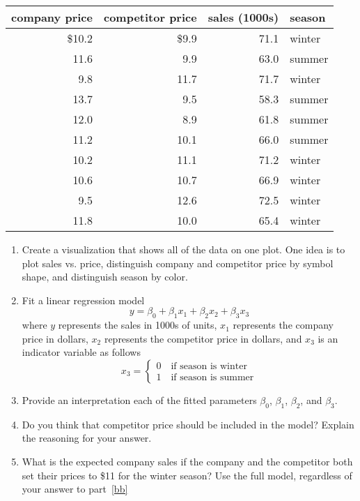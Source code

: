 \begin{enumerate}
\begin{center}
\begin{tabular}{rrrl}
company price & competitor price & sales (1000s) & season \\ \hline
         \$10.2         &     \$9.9  &71.1 &winter \\
         11.6         &     9.9  &63.0 &summer \\
          9.8         &    11.7  &71.7 &winter \\
         13.7         &     9.5  &58.3 &summer \\
         12.0         &     8.9  &61.8 &summer \\
         11.2         &    10.1  &66.0 &summer \\
         10.2         &    11.1  &71.2 &winter \\
         10.6         &    10.7  &66.9 &winter \\
          9.5         &    12.6  &72.5 &winter \\
         11.8         &    10.0  &65.4 &winter
\end{tabular}
\end{center}

\begin{enumerate}
\item Create a visualization that shows all of the data on one plot.
  One idea is to plot sales vs. price, distinguish company and competitor
  price by symbol shape, and distinguish season by color.
  \item Fit a linear regression model 
\[
y = \beta_0 + \beta_1x_1 + \beta_2x_2 + \beta_3x_3
\]
where $y$ represents the sales in 1000s of units, $x_1$ represents
the company price in dollars, $x_2$ represents the competitor price in
dollars, and $x_3$ is an indicator variable as follows
\[
x_3 = \begin{cases} 0 \quad \text{if season is winter} \\
1 \quad \text{if season is summer}
\end{cases}
\]
\item Provide an interpretation each of the fitted parameters $\beta_0$, $\beta_1$,
  $\beta_2$, and $\beta_3$. \label{aa}
\item Do you think that competitor price should be included in the
  model?  Explain the reasoning for your answer. \label{bb}
\item What is the expected company sales if the company and the
  competitor both set their prices to \$11 for the winter season?  Use
  the full model, regardless of your answer to
  part~\ref{bb} \label{cc}
\end{enumerate}


\end{enumerate}
